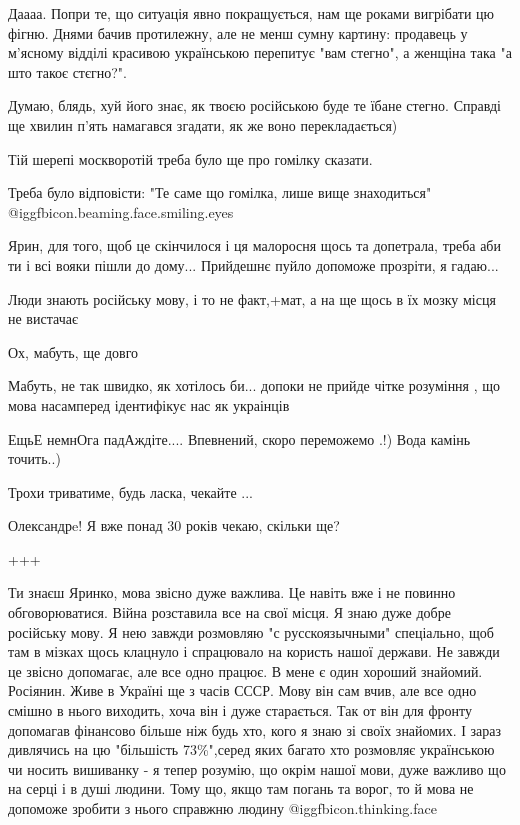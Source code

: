 \begin{itemize}

Даааа. Попри те, що ситуація явно покращується, нам ще роками вигрібати цю
фігню. Днями бачив протилежну, але не менш сумну картину: продавець у м'ясному
відділі красивою українською перепитує "вам стегно", а женщіна така "а што
такоє стєгно?".

Думаю, блядь, хуй його знає, як твоєю російською буде те їбане стегно. Справді
ще хвилин п'ять намагався згадати, як же воно перекладається)

\begin{itemize} %
Тій шерепі москворотій треба було ще про гомілку сказати.

Треба було відповісти: "Те саме що гомілка, лише вище знаходиться"
 @igg{fbicon.beaming.face.smiling.eyes} 
\end{itemize} %


Ярин, для того, щоб це скінчилося і ця малоросня щось та допетрала, треба аби
ти і всі вояки пішли до дому... Прийдешнє пуйло допоможе прозріти, я гадаю...

Люди знають російську мову, і то не факт,+мат, а на ще щось в їх мозку місця не вистачає

Ох, мабуть, ще довго

Мабуть, не так швидко, як хотілось би... допоки не прийде чітке розуміння , що мова насамперед ідентифікує нас як украінців

ЕщьЕ немнОга падАждіте....
Впевнений, скоро переможемо .!) Вода камінь точить..)

Трохи триватиме, будь ласка, чекайте ...

\begin{itemize} %
Олександрe! Я вже понад 30 років чекаю, скільки ще?
\end{itemize} %

+++


Ти знаєш Яринко, мова звісно дуже важлива. Це навіть вже і не повинно
обговорюватися. Війна розставила все на свої місця. Я знаю дуже добре російську
мову. Я нею завжди розмовляю "с русскоязычными" спеціально, щоб там в мізках щось
клацнуло і спрацювало на користь нашої держави. Не завжди це звісно
допомагає, але все одно працює. В мене є один хороший знайомий. Росіянин. Живе в
Україні ще з часів СССР. Мову він сам вчив, але все одно смішно в нього
виходить, хоча він і дуже старається. Так от він для фронту допомагав фінансово
більше ніж будь хто, кого я знаю зі своїх знайомих. І зараз дивлячись на цю
"більшість 73\%",серед яких багато хто розмовляє українською чи носить вишиванку
- я тепер розумію, що окрім нашої мови, дуже важливо що на серці і в душі
людини. Тому що, якщо там погань та ворог, то й мова не допоможе зробити з нього
справжню людину  @igg{fbicon.thinking.face} 


\end{itemize}
